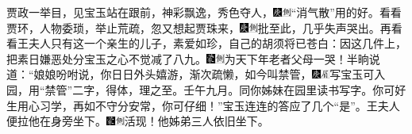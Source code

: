 贾政一举目，见宝玉站在跟前，神彩飘逸，秀色夺人，{\includegraphics[width=3mm]{../Images/00004}\includegraphics[width=3mm]{../Images/00011}\footnotesize \kaishu “消气散”用的好。}看看贾环，人物委琐，举止荒疏，忽又想起贾珠来，{\includegraphics[width=3mm]{../Images/00004}\includegraphics[width=3mm]{../Images/00011}\footnotesize \kaishu 批至此，几乎失声哭出。}再看看王夫人只有这一个亲生的儿子，素爱如珍，自己的胡须将已苍白：因这几件上，把素日嫌恶处分宝玉之心不觉减了八九。{\includegraphics[width=3mm]{../Images/00006}\includegraphics[width=3mm]{../Images/00011}\footnotesize \kaishu 为天下年老者父母一哭！}半晌说道：“娘娘吩咐说，你日日外头嬉游，渐次疏懒，如今叫禁管，{\includegraphics[width=3mm]{../Images/00004}\includegraphics[width=3mm]{../Images/00010}\footnotesize \kaishu 写宝玉可入园，用“禁管”二字，得体，理之至。壬午九月。}同你姊妹在园里读书写字。你可好生用心习学，再如不守分安常，你可仔细！”宝玉连连的答应了几个“是”。王夫人便拉他在身旁坐下。{\includegraphics[width=3mm]{../Images/00006}\includegraphics[width=3mm]{../Images/00011}\footnotesize \kaishu 活现！}他姊弟三人依旧坐下。

